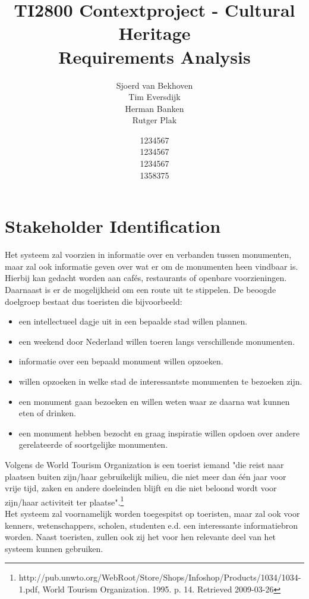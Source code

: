 \documentclass{article}
\begin{document}
\title{TI2800 Contextproject - Cultural Heritage \\ Requirements Analysis}
\author{Sjoerd van Bekhoven \\ Tim Eversdijk \\ Herman Banken \\ Rutger Plak \and 1234567 \\ 1234567 \\ 1234567 \\ 1358375}
\maketitle

\section{Stakeholder Identification}
Het systeem zal voorzien in informatie over en verbanden tussen monumenten, maar zal ook informatie geven over wat er om de monumenten heen vindbaar is. Hierbij kan gedacht worden aan caf\'es, restaurants of openbare voorzieningen. Daarnaast is er de mogelijkheid om een route uit te stippelen. De beoogde doelgroep bestaat dus toeristen die bijvoorbeeld:
\begin{itemize}
		\item{een intellectueel dagje uit in een bepaalde stad willen plannen.}
		\item{een weekend door Nederland willen toeren langs verschillende monumenten.}
		\item{informatie over een bepaald monument willen opzoeken.}
		\item{willen opzoeken in welke stad de interessantste monumenten te bezoeken zijn.}
		\item{een monument gaan bezoeken en willen weten waar ze daarna wat kunnen eten of drinken.}
		\item{een monument hebben bezocht en graag inspiratie willen opdoen over andere gerelateerde of soortgelijke monumenten.}
\end{itemize}
Volgens de World Tourism Organization is een toerist iemand "die reist naar plaatsen buiten zijn/haar gebruikelijk milieu, die niet meer dan \'e\'en jaar voor vrije tijd, zaken en andere doeleinden blijft en die niet beloond wordt voor zijn/haar activiteit ter plaatse".\footnote{http://pub.unwto.org/WebRoot/Store/Shops/Infoshop/Products/1034/1034-1.pdf, World Tourism Organization. 1995. p. 14. Retrieved 2009-03-26} \\
Het systeem zal voornamelijk worden toegespitst op toeristen, maar zal ook voor kenners, wetenschappers, scholen, studenten e.d. een interessante informatiebron worden. Naast toeristen, zullen ook zij het voor hen relevante deel van het systeem kunnen gebruiken.
\end{document}
